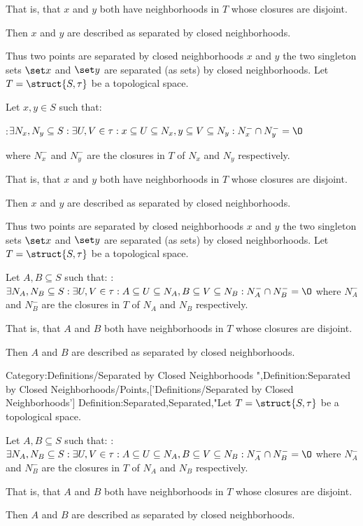 That is, that $x$ and $y$ both have neighborhoods in $T$ whose closures are disjoint.


Then $x$ and $y$ are described as separated by closed neighborhoods.


Thus two points are separated by closed neighborhoods $x$ and $y$  the two singleton sets $\set x$ and $\set y$ are separated (as sets) by closed neighborhoods.
Let $T = \struct {S, \tau}$ be a topological space.


Let $x, y \in S$ such that:

:$\exists N_x, N_y \subseteq S: \exists U, V \in \tau: x \subseteq U \subseteq N_x, y \subseteq V \subseteq N_y: N_x^- \cap N_y^- = \O$

where $N_x^-$ and $N_y^-$ are the closures in $T$ of $N_x$ and $N_y$ respectively.


That is, that $x$ and $y$ both have neighborhoods in $T$ whose closures are disjoint.


Then $x$ and $y$ are described as separated by closed neighborhoods.


Thus two points are separated by closed neighborhoods $x$ and $y$  the two singleton sets $\set x$ and $\set y$ are separated (as sets) by closed neighborhoods.
Let $T = \struct {S, \tau}$ be a topological space.


Let $A, B \subseteq S$ such that:
:$\exists N_A, N_B \subseteq S: \exists U, V \in \tau: A \subseteq U \subseteq N_A, B \subseteq V \subseteq N_B: N_A^- \cap N_B^- = \O$
where $N_A^-$ and $N_B^-$ are the closures in $T$ of $N_A$ and $N_B$ respectively.

That is, that $A$ and $B$ both have neighborhoods in $T$ whose closures are disjoint.


Then $A$ and $B$ are described as separated by closed neighborhoods.


Category:Definitions/Separated by Closed Neighborhoods
",Definition:Separated by Closed Neighborhoods/Points,['Definitions/Separated by Closed Neighborhoods']
Definition:Separated,Separated,"Let $T = \struct {S, \tau}$ be a topological space.


Let $A, B \subseteq S$ such that:
:$\exists N_A, N_B \subseteq S: \exists U, V \in \tau: A \subseteq U \subseteq N_A, B \subseteq V \subseteq N_B: N_A^- \cap N_B^- = \O$
where $N_A^-$ and $N_B^-$ are the closures in $T$ of $N_A$ and $N_B$ respectively.

That is, that $A$ and $B$ both have neighborhoods in $T$ whose closures are disjoint.


Then $A$ and $B$ are described as separated by closed neighborhoods.


